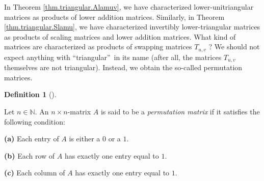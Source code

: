 \documentclass[numbers=enddot,12pt,final,onecolumn,notitlepage]{scrartcl}%
\theoremstyle{definition}
\newtheorem{defi}[theo]{Definition}
\newenvironment{definition}[1][]
{\begin{defi}[#1]\begin{leftbar}}
{\end{leftbar}\end{defi}}
\begin{document}
In Theorem \ref{thm.triangular.Alamuv}, we have characterized
lower-unitriangular matrices as products of lower addition matrices.
Similarly, in Theorem \ref{thm.triangular.Slamu}, we have characterized
invertibly lower-triangular matrices as products of scaling matrices and lower
addition matrices. What kind of matrices are characterized as products of
swapping matrices $T_{u,v}$ ? We should not expect anything with
\textquotedblleft triangular\textquotedblright\ in its name (after all, the
matrices $T_{u,v}$ themselves are not triangular). Instead, we obtain the
so-called permutation matrices.

\begin{definition}
\label{def.permat}Let $n\in\mathbb{N}$. An $n\times n$-matrix $A$ is said to
be a \textit{permutation matrix} if it satisfies the following condition:

\textbf{(a)} Each entry of $A$ is either a $0$ or a $1$.

\textbf{(b)} Each row of $A$ has exactly one entry equal to $1$.

\textbf{(c)} Each column of $A$ has exactly one entry equal to $1$.
\end{definition}
\end{document}
